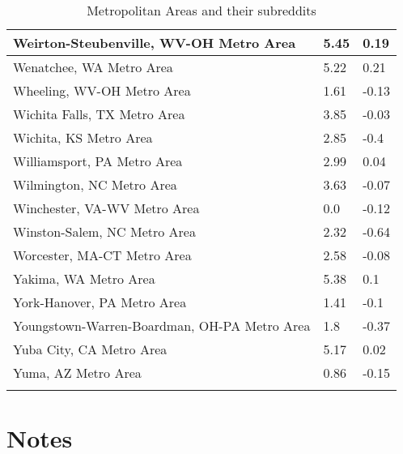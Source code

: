 \documentclass[12pt,oneside, letterpaper]{book}
\begin{document}
\begin{longtable}{| p{} | p{} | p{} |}
    Weirton-Steubenville, WV-OH Metro Area & 5.45 & 0.19 \\ \hline
    Wenatchee, WA Metro Area & 5.22 & 0.21 \\ \hline
    Wheeling, WV-OH Metro Area & 1.61 & -0.13 \\ \hline
    Wichita Falls, TX Metro Area & 3.85 & -0.03 \\ \hline
    Wichita, KS Metro Area & 2.85 & -0.4 \\ \hline
    Williamsport, PA Metro Area & 2.99 & 0.04 \\ \hline
    Wilmington, NC Metro Area & 3.63 & -0.07 \\ \hline
    Winchester, VA-WV Metro Area & 0.0 & -0.12 \\ \hline
    Winston-Salem, NC Metro Area & 2.32 & -0.64 \\ \hline
    Worcester, MA-CT Metro Area & 2.58 & -0.08 \\ \hline
    Yakima, WA Metro Area & 5.38 & 0.1 \\ \hline
    York-Hanover, PA Metro Area & 1.41 & -0.1 \\ \hline
    Youngstown-Warren-Boardman, OH-PA Metro Area & 1.8 & -0.37 \\ \hline
    Yuba City, CA Metro Area & 5.17 & 0.02 \\ \hline
    Yuma, AZ Metro Area & 0.86 & -0.15 \\ \hline
    \caption{Metropolitan Areas and their subreddits}
	\label{table:app-a}
\end{longtable}


\newpage
\chapter*{Notes}

\newpage
{}
\fontsize{10}{10pt} \selectfont

\renewcommand{\bibname}{References}

\printbibliography
\end{document}
